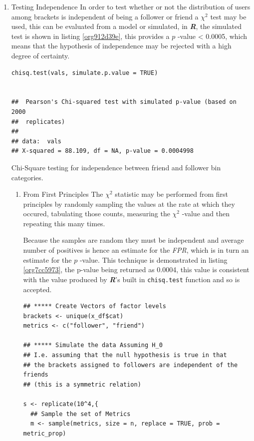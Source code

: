 \documentclass[11pt]{article}
\begin{document}
\begin{enumerate}
\item Testing Independence
\label{sec:orgc49f8f2}
In order to test whether or not the distribution of users among brackets is
independent of being a follower or friend a \(\chi^{2}\) test may be used, this
can be evaluated from a model or simulated, in \textbf{\emph{R}}, the simulated test is
shown in listing \ref{org912d39e}, this provides a \(p\) -value < 0.0005, which means that the hypothesis of independence may be rejected with a high degree of certainty.

\begin{listing}[htbp]
\begin{verbatim}
chisq.test(vals, simulate.p.value = TRUE)


## 	Pearson's Chi-squared test with simulated p-value (based on 2000
## 	replicates)
##
## data:  vals
## X-squared = 88.109, df = NA, p-value = 0.0004998
\end{verbatim}
\caption{\label{org912d39e}Chi-Square testing for independence between friend and follower bin categories.}
\end{listing}

\begin{enumerate}
\item From First Principles
\label{sec:org82749f3}
The \(\chi^{2}\) statistic may be performed from first principles by randomly
sampling the values at the rate at which they occured, tabulating those counts, measuring the \(\chi^{2}\) -value and then repeating this many times.

Because the samples are random they must be independent and average number of
positives is hence an estimate for the \emph{FPR}, which is in turn an estimate for
the \(p\) -value. This technique is demonstrated in listing \ref{org7cc5973}, the p-value
being returned as 0.0004, this value is consistent with the value produced by
\textbf{\emph{R}}'s built in \texttt{chisq.test} function and so is accepted.

\begin{listing}[htbp]
\begin{verbatim}
## ***** Create Vectors of factor levels
brackets <- unique(x_df$cat)
metrics <- c("follower", "friend")

## ***** Simulate the data Assuming H_0
## I.e. assuming that the null hypothesis is true in that
## the brackets assigned to followers are independent of the friends
## (this is a symmetric relation)

s <- replicate(10^4,{
  ## Sample the set of Metrics
  m <- sample(metrics, size = n, replace = TRUE, prob = metric_prop)


\end{verbatim}
\end{listing}
\end{enumerate}
\end{enumerate}
\end{document}
